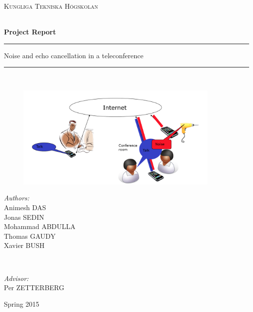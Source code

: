 \documentclass[11pt,a4paper,spanish]{book}  %
\newcommand{\HRule}{\rule{\linewidth}{0.5mm}}
\theoremstyle{definition}  %
\theoremstyle{plain}  %
\theoremstyle{remark}  %
\begin{document}
\begin{titlepage}
\begin{center}


\textsc{\LARGE Kungliga Tekniska Högskolan}\\[1.5cm]

\textsc{\Large ~}\\[-0.5cm]


{ \huge \bfseries \textbf{Project Report} \\

\HRule

 Noise and echo cancellation in a teleconference\\[0.4cm]}

\HRule \\[1.1cm]

		\begin{figure}[h]
		\centering
		\includegraphics[width=10cm]{images/other/scenario}
		\label{scenario}
		\end{figure}

\begin{minipage}{0.4\textwidth}
\begin{flushleft}
\emph{Authors:}\\
Animesh DAS \\ Jonas SEDIN \\ Mohammad ABDULLA \\ Thomas GAUDY \\ Xavier BUSH
\end{flushleft}
\end{minipage}
~
\begin{minipage}{0.4\textwidth}
\begin{flushright}
\emph{Advisor:}\\
Per ZETTERBERG
\end{flushright}
\end{minipage}

\vfill

{\large Spring 2015} \\[1cm]
\end{center}



\end{titlepage}
\restoregeometry
\end{document}

